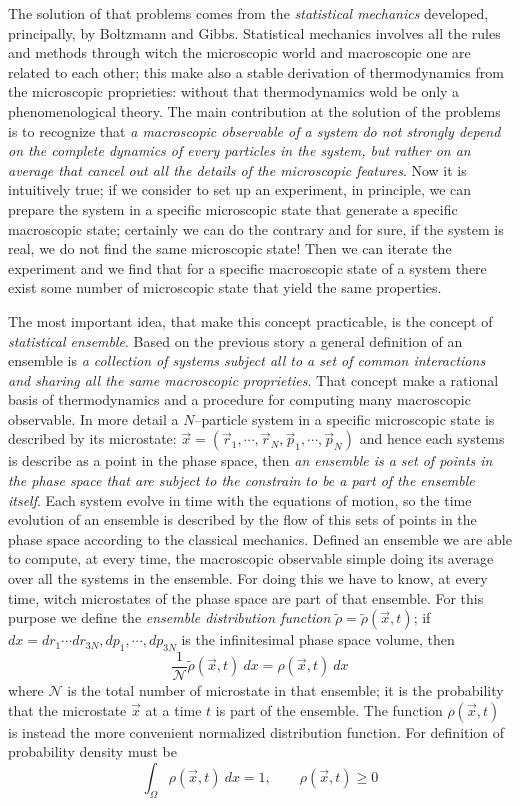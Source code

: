 The solution of that problems comes from the \textit{statistical mechanics} developed, principally, by Boltzmann and Gibbs. Statistical mechanics involves all the rules and methods through witch the microscopic world and macroscopic one are related to each other; this make also a stable derivation of thermodynamics from the microscopic proprieties: without that thermodynamics wold be only a phenomenological theory. The main contribution at the solution of the problems is to recognize that \textit{a macroscopic observable of a system do not strongly depend on the complete dynamics of every particles in the system, but rather on an \textit{average} that cancel out all the details of the microscopic features}. Now it is intuitively true; if we consider to set up an experiment, in principle, we can prepare the system in a specific microscopic state that generate a specific macroscopic state; certainly we can do the contrary and for sure, if the system is real, we do not find the same microscopic state! Then we can iterate the experiment and we find that for a specific macroscopic state of a system there exist some number of microscopic state that yield the same properties.

The most important idea, that make this concept practicable, is the concept of \textit{statistical ensemble}. Based on the previous story a general definition of an ensemble is \textit{a collection of systems subject all to a set of common interactions and sharing all the same macroscopic proprieties}. That concept make a rational basis of thermodynamics and a procedure for computing many macroscopic observable. In more detail a $N$--particle system in a specific microscopic state is described by its microstate: $\vec x = (\vec r_1,\cdots,\vec r_N, \vec p_1, \cdots, \vec p_N)$ and hence each systems is describe as a point in the phase space, then \textit{an ensemble is a set of points in the phase space that are subject to the constrain to be a part of the ensemble itself}. Each system evolve in time with the equations of motion, so the time evolution of an ensemble is described by the flow of this sets of points in the phase space according to the classical mechanics. Defined an ensemble we are able to compute, at every time, the macroscopic observable simple doing its average over all the systems in the ensemble. For doing this we have to know, at every time, witch microstates of the phase space are part of that ensemble. For this purpose we define the \textit{ensemble distribution function} $\tilde\rho = \tilde\rho(\vec x,t)$; if $dx = dr_1\cdots dr_{3N}, dp_1, \cdots,dp_{3N}$ is the infinitesimal phase space volume, then
\begin{equation*}
	\frac{1}{\mathcal{N}}\tilde\rho(\vec x, t)\ dx = \rho(\vec x, t)\ dx
\end{equation*}
where $\mathcal{N}$ is the total number of microstate in that ensemble; it is the probability that the microstate $\vec x$ at a time $t$ is part of the ensemble. The function $\rho(\vec x, t)$ is instead the more convenient normalized distribution function. For definition of probability density must be
\begin{equation*}
		\int_{\Omega} \rho(\vec x, t)\ dx = 1, \qquad \rho(\vec x, t) \ge 0
\end{equation*}

